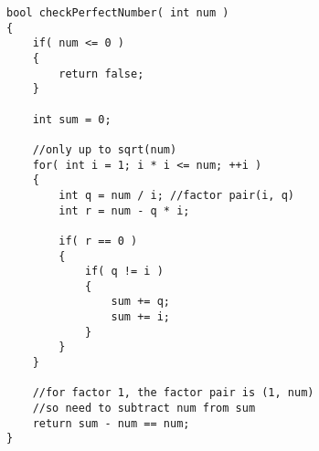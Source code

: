 \setcounter{lstlisting}{0}
\begin{lstlisting}[style=customc, caption={Optimal Approach}]
bool checkPerfectNumber( int num )
{
    if( num <= 0 )
    {
        return false;
    }

    int sum = 0;

    //only up to sqrt(num)
    for( int i = 1; i * i <= num; ++i )
    {
        int q = num / i; //factor pair(i, q)
        int r = num - q * i;

        if( r == 0 )
        {
            if( q != i )
            {
                sum += q;
                sum += i;
            }
        }
    }

    //for factor 1, the factor pair is (1, num)
    //so need to subtract num from sum
    return sum - num == num;
}
\end{lstlisting}